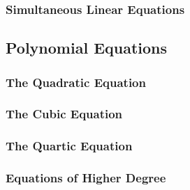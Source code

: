 \subsubsection{Simultaneous Linear Equations}






\subsection{Polynomial Equations}

\subsubsection{The Quadratic Equation}

\subsubsection{The Cubic Equation}

\subsubsection{The Quartic Equation}





\subsubsection{Equations of Higher Degree}

